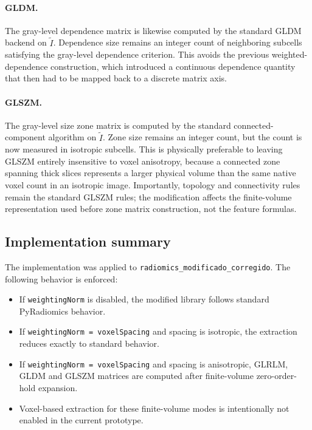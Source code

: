 \paragraph{GLDM.}
The gray-level dependence matrix is likewise computed by the standard GLDM backend on $\tilde I$. Dependence size
remains an integer count of neighboring subcells satisfying the gray-level dependence criterion. This avoids the
previous weighted-dependence construction, which introduced a continuous dependence quantity that then had to be
mapped back to a discrete matrix axis.

\paragraph{GLSZM.}
The gray-level size zone matrix is computed by the standard connected-component algorithm on $\tilde I$. Zone size
remains an integer count, but the count is now measured in isotropic subcells. This is physically preferable to
leaving GLSZM entirely insensitive to voxel anisotropy, because a connected zone spanning thick slices represents a
larger physical volume than the same native voxel count in an isotropic image. Importantly, topology and connectivity
rules remain the standard GLSZM rules; the modification affects the finite-volume representation used before zone
matrix construction, not the feature formulas.

\subsection{Implementation summary}

The implementation was applied to \texttt{radiomics\_modificado\_corregido}. The following behavior is enforced:
\begin{itemize}
  \item If \texttt{weightingNorm} is disabled, the modified library follows standard PyRadiomics behavior.
  \item If \texttt{weightingNorm = voxelSpacing} and spacing is isotropic, the extraction reduces exactly to standard
  behavior.
  \item If \texttt{weightingNorm = voxelSpacing} and spacing is anisotropic, GLRLM, GLDM and GLSZM matrices are
  computed after finite-volume zero-order-hold expansion.
  \item Voxel-based extraction for these finite-volume modes is intentionally not enabled in the current prototype.
\end{itemize}

